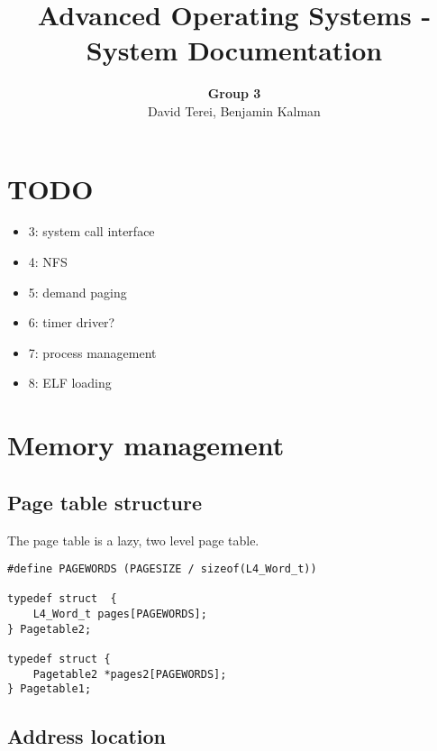 \documentclass[12pt,english]{article}
\begin{document}

\title{Advanced Operating Systems - System Documentation}
\author{\textbf{Group 3} \\ David Terei, Benjamin Kalman}
\maketitle

\tableofcontents{}


\newpage{}
\section{TODO}

\begin{itemize}
\item 3: system call interface
\item 4: NFS
\item 5: demand paging
\item 6: timer driver?
\item 7: process management
\item 8: ELF loading
\end{itemize}


\section{Memory management}

\subsection{Page table structure}

The page table is a lazy, two level page table.  

\begin{verbatim}
#define PAGEWORDS (PAGESIZE / sizeof(L4_Word_t))

typedef struct  {
    L4_Word_t pages[PAGEWORDS];
} Pagetable2;

typedef struct {
    Pagetable2 *pages2[PAGEWORDS];
} Pagetable1;
\end{verbatim}

\subsection{Address location}
\end{document}
